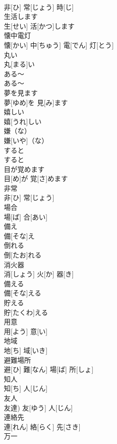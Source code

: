 \documentclass[8pt]{extreport}
\begin{document}
\begin{CJK}{UTF8}{min}
\\	非[ひ] 常[じょう] 時[じ]		
\\	生活します	
\\	生[せい] 活[かつ]します		
\\	懐中電灯	
\\	懐[かい] 中[ちゅう] 電[でん] 灯[とう]		
\\	丸い	
\\	丸[まる]い		
\\	ある～	
\\	ある～		
\\	夢を見ます	
\\	夢[ゆめ]を 見[み]ます		
\\	嬉しい	
\\	嬉[うれ]しい		
\\	嫌（な）	
\\	嫌[いや]（な）		
\\	すると	
\\	すると		
\\	目が覚めます	
\\	目[め]が 覚[さ]めます		
\\	非常	
\\	非[ひ] 常[じょう]		
\\	場合	
\\	場[ば] 合[あい]		
\\	備え	
\\	備[そな]え		
\\	倒れる	
\\	倒[たお]れる		
\\	消火器	
\\	消[しょう] 火[か] 器[き]		
\\	備える	
\\	備[そな]える		
\\	貯える	
\\	貯[たくわ]える		
\\	用意	
\\	用[よう] 意[い]		
\\	地域	
\\	地[ち] 域[いき]		
\\	避難場所	
\\	避[ひ] 難[なん] 場[ば] 所[しょ]		
\\	知人	
\\	知[ち] 人[じん]		
\\	友人	
\\	友達)	友[ゆう] 人[じん]		
\\	連絡先	
\\	連[れん] 絡[らく] 先[さき]		
\\	万一	

\end{CJK}
\end{document}
